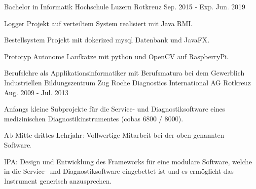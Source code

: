 

\begin{cventries}

  \cventry
    {Bachelor in Informatik} %
    {Hochschule Luzern} %
    {Rotkreuz} %
    {Sep. 2015 - Exp. Jun. 2019} %
    {
      \begin{cvitems} %
        \item {Logger Projekt auf verteiltem System realisiert mit Java RMI.}
	    \item {Bestellsystem Projekt mit dokerized mysql Datenbank und JavaFX.}
	    \item {Prototyp Autonome Laufkatze mit python und OpenCV auf RaspberryPi.}
      \end{cvitems}
    }

\cventry
{Berufslehre als Applikationsinformatiker mit Berufsmatura bei dem Gewerblich Industriellen Bildungszentrum Zug} %
{Roche Diagnostics International AG} %
{Rotkreuz} %
{Aug. 2009 - Jul. 2013} %
{
	\begin{cvitems} %
		\item {Anfangs kleine Subprojekte für die Service- und Diagnostiksoftware eines medizinischen Diagnostikinstrumentes (cobas 6800 / 8000).}
		\item {Ab Mitte drittes Lehrjahr: Vollwertige Mitarbeit bei der oben genannten Software.}
		\item {IPA: Design und Entwicklung des Frameworks für eine modulare Software, welche in die Service- und Diagnostiksoftware eingebettet ist und es ermöglicht das Instrument generisch anzusprechen.}
	\end{cvitems}
}

\end{cventries}
